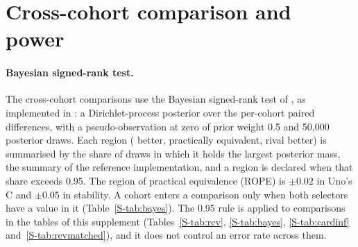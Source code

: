 \section{Cross-cohort comparison and power}\label{S-sec:bayes}

\paragraph{Bayesian signed-rank test.} The cross-cohort comparisons use the Bayesian
signed-rank test of \citet{benavoli2017}, as implemented in
: a Dirichlet-process posterior over the per-cohort paired
differences, with a pseudo-observation at zero of prior weight 0.5 and 50{,}000
posterior draws. Each region ( better, practically equivalent, rival
better) is summarised by the share of draws in which it holds the largest posterior
mass, the summary of the reference implementation, and a region is declared when that
share exceeds 0.95. The region of practical equivalence (ROPE) is $\pm 0.02$ in Uno's C
and $\pm 0.05$ in stability. A cohort enters a comparison only when both selectors have a
value in it (Table~\ref{S-tab:bayes}). The 0.95 rule is applied to \SuppNComparisons{}
comparisons in the tables of this supplement (Tables~\ref{S-tab:rcv}, \ref{S-tab:bayes},
\ref{S-tab:cardinf} and~\ref{S-tab:rcvmatched}), and it does not control an error rate
across them.

